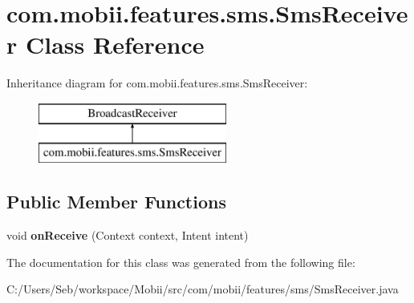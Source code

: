 \hypertarget{classcom_1_1mobii_1_1features_1_1sms_1_1_sms_receiver}{\section{com.\-mobii.\-features.\-sms.\-Sms\-Receiver Class Reference}
\label{classcom_1_1mobii_1_1features_1_1sms_1_1_sms_receiver}
}
Inheritance diagram for com.\-mobii.\-features.\-sms.\-Sms\-Receiver\-:\begin{figure}[H]
\begin{center}
\leavevmode
\includegraphics[height=2.000000cm]{classcom_1_1mobii_1_1features_1_1sms_1_1_sms_receiver}
\end{center}
\end{figure}
\subsection*{Public Member Functions}
\begin{DoxyCompactItemize}
\item 
\hypertarget{classcom_1_1mobii_1_1features_1_1sms_1_1_sms_receiver_a228e2d09cc0b38bd9b877c0a6dc6433d}{void {\bfseries on\-Receive} (Context context, Intent intent)}\label{classcom_1_1mobii_1_1features_1_1sms_1_1_sms_receiver_a228e2d09cc0b38bd9b877c0a6dc6433d}

\end{DoxyCompactItemize}


The documentation for this class was generated from the following file\-:\begin{DoxyCompactItemize}
\item 
C\-:/\-Users/\-Seb/workspace/\-Mobii/src/com/mobii/features/sms/Sms\-Receiver.\-java\end{DoxyCompactItemize}
